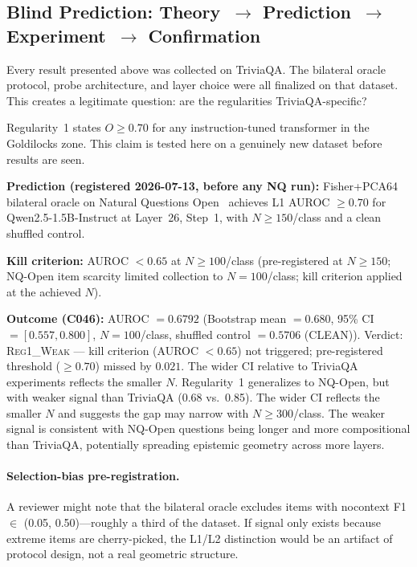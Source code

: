 \documentclass[11pt]{article}
\begin{document}
\subsection{Blind Prediction: Theory~$\to$ Prediction~$\to$ Experiment~$\to$ Confirmation}
\label{sec:blind}

Every result presented above was collected on TriviaQA. The bilateral oracle
protocol, probe architecture, and layer choice were all finalized on that dataset.
This creates a legitimate question: are the regularities TriviaQA-specific?

Regularity~1 states $O \geq 0.70$ for any instruction-tuned transformer in the
Goldilocks zone. This claim is tested here on a genuinely new dataset before
results are seen.

\textbf{Prediction (registered 2026-07-13, before any NQ run):}
Fisher+PCA64 bilateral oracle on Natural Questions Open~\citep{kwiatkowski2019nq}
achieves L1 AUROC $\geq 0.70$ for Qwen2.5-1.5B-Instruct at Layer~26, Step~1,
with $N \geq 150$/class and a clean shuffled control.

\textbf{Kill criterion:} AUROC $< 0.65$ at $N \geq 100$/class (pre-registered at
$N \geq 150$; NQ-Open item scarcity limited collection to $N = 100$/class; kill
criterion applied at the achieved $N$).

\textbf{Outcome (C046):} AUROC $= 0.6792$ (Bootstrap mean $= 0.680$,
95\% CI $= [0.557, 0.800]$, $N=100$/class, shuffled control $= 0.5706$ (CLEAN)).
Verdict: \textsc{Reg1\_Weak} --- kill criterion (AUROC $< 0.65$) not triggered;
pre-registered threshold ($\geq 0.70$) missed by $0.021$. The wider CI relative to
TriviaQA experiments reflects the smaller $N$.
Regularity~1 generalizes to NQ-Open, but with weaker signal than TriviaQA
(0.68 vs.\ 0.85). The wider CI reflects the smaller $N$ and suggests
the gap may narrow with $N \geq 300$/class. The weaker signal is consistent
with NQ-Open questions being longer and more compositional than TriviaQA,
potentially spreading epistemic geometry across more layers.

\paragraph{Selection-bias pre-registration.}
A reviewer might note that the bilateral oracle excludes items with nocontext
F1 $\in$ (0.05, 0.50)---roughly a third of the dataset.
If signal only exists because extreme items are cherry-picked, the
L1/L2 distinction would be an artifact of protocol design, not a real
geometric structure.
\end{document}
